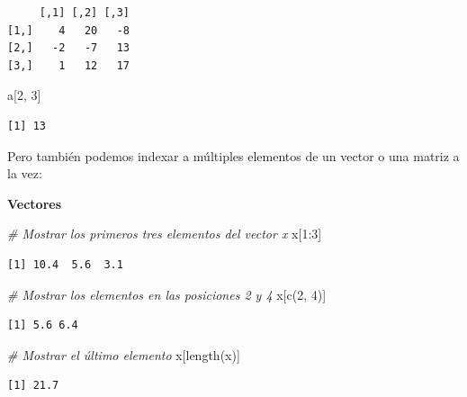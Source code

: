 \documentclass[
]{book}
\newenvironment{Shaded}{\begin{snugshade}}{\end{snugshade}}
\newcommand{\CommentTok}[1]{\textcolor[rgb]{0.56,0.35,0.01}{\textit{#1}}}
\newcommand{\DecValTok}[1]{\textcolor[rgb]{0.00,0.00,0.81}{#1}}
\newcommand{\FunctionTok}[1]{\textcolor[rgb]{0.00,0.00,0.00}{#1}}
\newcommand{\NormalTok}[1]{#1}
\newcommand{\SpecialCharTok}[1]{\textcolor[rgb]{0.00,0.00,0.00}{#1}}
\begin{document}
\begin{verbatim}
     [,1] [,2] [,3]
[1,]    4   20   -8
[2,]   -2   -7   13
[3,]    1   12   17
\end{verbatim}

\begin{Shaded}
\begin{Highlighting}[]
\NormalTok{a[}\DecValTok{2}\NormalTok{, }\DecValTok{3}\NormalTok{]}
\end{Highlighting}
\end{Shaded}

\begin{verbatim}
[1] 13
\end{verbatim}

Pero también podemos indexar a múltiples elementos de un vector o una matriz a la vez:

\textbf{Vectores}

\begin{Shaded}
\begin{Highlighting}[]
\CommentTok{\# Mostrar los primeros tres elementos del vector x}
\NormalTok{x[}\DecValTok{1}\SpecialCharTok{:}\DecValTok{3}\NormalTok{]}
\end{Highlighting}
\end{Shaded}

\begin{verbatim}
[1] 10.4  5.6  3.1
\end{verbatim}

\begin{Shaded}
\begin{Highlighting}[]
\CommentTok{\# Mostrar los elementos en las posiciones 2 y 4}
\NormalTok{x[}\FunctionTok{c}\NormalTok{(}\DecValTok{2}\NormalTok{, }\DecValTok{4}\NormalTok{)]}
\end{Highlighting}
\end{Shaded}

\begin{verbatim}
[1] 5.6 6.4
\end{verbatim}

\begin{Shaded}
\begin{Highlighting}[]
\CommentTok{\# Mostrar el último elemento}
\NormalTok{x[}\FunctionTok{length}\NormalTok{(x)]}
\end{Highlighting}
\end{Shaded}

\begin{verbatim}
[1] 21.7
\end{verbatim}
\end{document}
